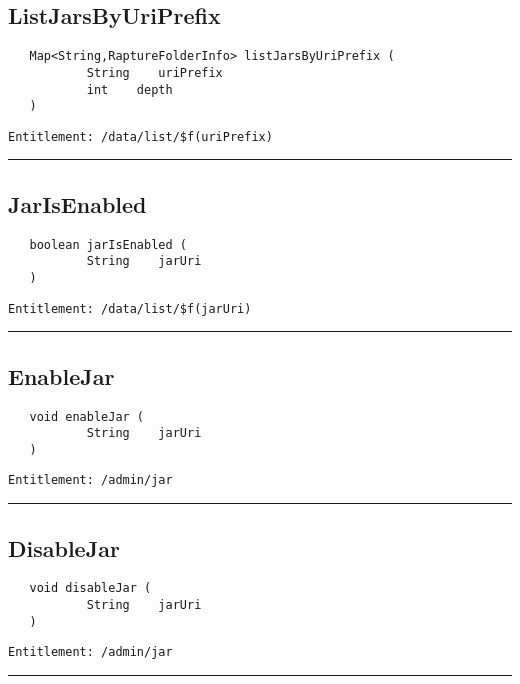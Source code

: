 \subsection{ListJarsByUriPrefix}
\label{Api:ListJarsByUriPrefix}
\begin{Verbatim}
   Map<String,RaptureFolderInfo> listJarsByUriPrefix (
           String    uriPrefix
           int    depth
   )
\end{Verbatim}
\begin{Verbatim}[formatcom=\color{Maroon}]
  Entitlement: /data/list/$f(uriPrefix)
\end{Verbatim}



\rule{12cm}{2pt}
\subsection{JarIsEnabled}
\label{Api:JarIsEnabled}
\begin{Verbatim}
   boolean jarIsEnabled (
           String    jarUri
   )
\end{Verbatim}
\begin{Verbatim}[formatcom=\color{Maroon}]
  Entitlement: /data/list/$f(jarUri)
\end{Verbatim}



\rule{12cm}{2pt}
\subsection{EnableJar}
\label{Api:EnableJar}
\begin{Verbatim}
   void enableJar (
           String    jarUri
   )
\end{Verbatim}
\begin{Verbatim}[formatcom=\color{Maroon}]
  Entitlement: /admin/jar
\end{Verbatim}



\rule{12cm}{2pt}
\subsection{DisableJar}
\label{Api:DisableJar}
\begin{Verbatim}
   void disableJar (
           String    jarUri
   )
\end{Verbatim}
\begin{Verbatim}[formatcom=\color{Maroon}]
  Entitlement: /admin/jar
\end{Verbatim}



\rule{12cm}{2pt}

